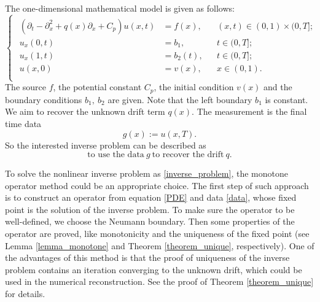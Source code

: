 \documentclass[11pt]{article}
\numberwithin{equation}{section}
\begin{document}
The one-dimensional mathematical model is given as follows: 
\begin{equation}\label{PDE}
 \begin{cases}
  \begin{aligned}
   (\partial_t-\partial_x^2+q(x)\partial_x+C_p)u(x,t)&=f(x), &&(x,t)\in(0,1)\times(0,T];\\
   u_x(0,t)&=b_1,&&t\in(0,T];\\
   u_x(1,t)&=b_2(t),&&t\in(0,T];\\
   u(x,0)&=v(x),&&x\in(0,1).\\
  \end{aligned}
 \end{cases}
\end{equation}
The source $f$, the potential constant $C_p$, the initial condition $v(x)$ and the boundary conditions $b_1,\ b_2$ are given. Note that the left boundary $b_1$ is constant. We aim to recover the unknown drift term $q(x)$. The measurement is the final time data 
\begin{equation}\label{data}
 g(x):=u(x,T).
\end{equation}
So the interested inverse problem can be described as  
\begin{equation}\label{inverse_problem}
 \text{to use the data}\ g\ \text{to recover the drift}\ q. 
\end{equation}

To solve the nonlinear inverse problem as \eqref{inverse_problem}, the monotone operator method could be an appropriate choice. The first step of such approach is to construct an operator from equation \eqref{PDE} and data \eqref{data}, whose fixed point is the solution of the inverse problem. To make sure the operator to be well-defined, we choose the Neumann boundary. Then some properties of the operator are proved, like monotonicity and the uniqueness of the fixed point (see Lemma \ref{lemma_monotone} and Theorem \ref{theorem_unique}, respectively). One of the advantages of this method is that the proof of uniqueness of the inverse problem contains an iteration converging to the unknown drift, which could be used in the numerical reconstruction. See the proof of Theorem \ref{theorem_unique} for details. 
\end{document}
